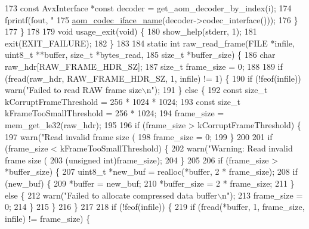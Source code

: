 \begin{DoxyCodeInclude}
{{{{173     \textcolor{keyword}{const} AvxInterface *\textcolor{keyword}{const} decoder = get\_aom\_decoder\_by\_index(i);
174     fprintf(fout, \textcolor{stringliteral}{"    %
175             \hyperlink{group__codec_ga013b1f6d96b2cf9489396311a7e5179b}{aom\_codec\_iface\_name}(decoder->codec\_interface()));
176   \}
177 \}
178 
179 \textcolor{keywordtype}{void} usage\_exit(\textcolor{keywordtype}{void}) \{
180   show\_help(stderr, 1);
181   exit(EXIT\_FAILURE);
182 \}
183 
184 \textcolor{keyword}{static} \textcolor{keywordtype}{int} raw\_read\_frame(FILE *infile, uint8\_t **buffer, \textcolor{keywordtype}{size\_t} *bytes\_read,
185                           \textcolor{keywordtype}{size\_t} *buffer\_size) \{
186   \textcolor{keywordtype}{char} raw\_hdr[RAW\_FRAME\_HDR\_SZ];
187   \textcolor{keywordtype}{size\_t} frame\_size = 0;
188 
189   \textcolor{keywordflow}{if} (fread(raw\_hdr, RAW\_FRAME\_HDR\_SZ, 1, infile) != 1) \{
190     \textcolor{keywordflow}{if} (!feof(infile)) warn(\textcolor{stringliteral}{"Failed to read RAW frame size\(\backslash\)n"});
191   \} \textcolor{keywordflow}{else} \{
192     \textcolor{keyword}{const} \textcolor{keywordtype}{size\_t} kCorruptFrameThreshold = 256 * 1024 * 1024;
193     \textcolor{keyword}{const} \textcolor{keywordtype}{size\_t} kFrameTooSmallThreshold = 256 * 1024;
194     frame\_size = mem\_get\_le32(raw\_hdr);
195 
196     \textcolor{keywordflow}{if} (frame\_size > kCorruptFrameThreshold) \{
197       warn(\textcolor{stringliteral}{"Read invalid frame size (%
198       frame\_size = 0;
199     \}
200 
201     \textcolor{keywordflow}{if} (frame\_size < kFrameTooSmallThreshold) \{
202       warn(\textcolor{stringliteral}{"Warning: Read invalid frame size (%
203            (\textcolor{keywordtype}{unsigned} \textcolor{keywordtype}{int})frame\_size);
204     \}
205 
206     \textcolor{keywordflow}{if} (frame\_size > *buffer\_size) \{
207       uint8\_t *new\_buf = realloc(*buffer, 2 * frame\_size);
208       \textcolor{keywordflow}{if} (new\_buf) \{
209         *buffer = new\_buf;
210         *buffer\_size = 2 * frame\_size;
211       \} \textcolor{keywordflow}{else} \{
212         warn(\textcolor{stringliteral}{"Failed to allocate compressed data buffer\(\backslash\)n"});
213         frame\_size = 0;
214       \}
215     \}
216   \}
217 
218   \textcolor{keywordflow}{if} (!feof(infile)) \{
219     \textcolor{keywordflow}{if} (fread(*buffer, 1, frame\_size, infile) != frame\_size) \{
}}}}}}}
\end{DoxyCodeInclude}
